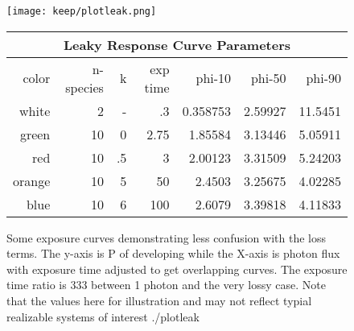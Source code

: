 
{
\begin{figure}[H]
{ \texttt{[image: keep/plotleak.png]} }
\begin{tabular}{|r|r|r|r|r|r|r|}
\hline
\multicolumn{7}{|c|}{Leaky Response Curve Parameters }\\
\hline
color & n-species &k & exp time & phi-10 & phi-50 &phi-90 \\
\hline
white & 2 &- & .3 & 0.358753 &  2.59927 &  11.5451 \\
green & 10 &0 & 2.75 &  1.85584 &  3.13446 &  5.05911 \\
red & 10 &.5 &  3 &   2.00123  &   3.31509 &  5.24203 \\
orange & 10 &5 &  50 &  2.4503 &  3.25675 &  4.02285 \\
blue  & 10 & 6 &  100 & 2.6079  &    3.39818 &  4.11833 \\
\hline
\end{tabular}
\caption{ Some exposure curves demonstrating less confusion with the loss terms. The y-axis is P of developing while the X-axis is photon flux with exposure time adjusted to get overlapping curves. The exposure time ratio is 333 between 1 photon and the very lossy case. Note that the values here for illustration and may not reflect typial realizable systems of interest  ./plotleak  }
\label{fig:plotleakt}
\end{figure} 
} %
 





\begin{comment}
\begin{table}[H] \centering
\begin{tabular}{|r|r|r|r|r|r|r|}
\hline
\multicolumn{7}{|c|}{Leaky Response Curve Parameters }\\
\hline
color & n-species &k & exp time & phi-10 & phi-50 &phi-90 \\
\hline
white & 2 &- & .3 & 0.358753 &  2.59927 &  11.5451 \\
green & 10 &0 & 2.75 &  1.85584 &  3.13446 &  5.05911 \\
red & 10 &.5 &  3 &   2.00123  &   3.31509 &  5.24203 \\
orange & 10 &5 &  50 &  2.4503 &  3.25675 &  4.02285 \\
blue  & 10 & 6 &  100 & 2.6079  &    3.39818 p&  4.11833 \\
\hline
\end{tabular}

\caption{}
\end{table}
\end{comment}



